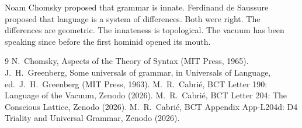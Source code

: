 \documentclass[aps,prl,twocolumn,superscriptaddress]{revtex4-2}
\begin{document}
\begin{acknowledgments}
Noam Chomsky proposed that grammar is innate. Ferdinand de Saussure proposed that language is a system of differences. Both were right. The differences are geometric. The innateness is topological. The vacuum has been speaking since before the first hominid opened its mouth.
\end{acknowledgments}

\begin{thebibliography}{9}
 N.~Chomsky, Aspects of the Theory of Syntax (MIT Press, 1965).
 J.~H.~Greenberg, Some universals of grammar, in Universals of Language, ed.\ J.~H.~Greenberg (MIT Press, 1963).
 M.~R.~Cabri\'e, BCT Letter 190: Language of the Vacuum, Zenodo (2026).
 M.~R.~Cabri\'e, BCT Letter 204: The Conscious Lattice, Zenodo (2026).
 M.~R.~Cabri\'e, BCT Appendix App-L204d: D4 Triality and Universal Grammar, Zenodo (2026).
\end{thebibliography}
\end{document}
